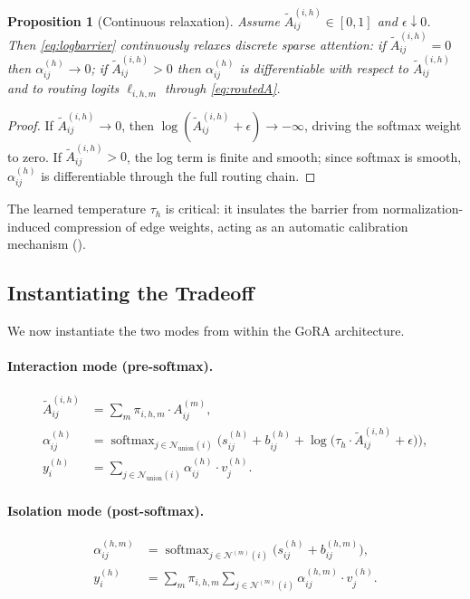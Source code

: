 \documentclass[11pt,a4paper]{article}
\newtheorem{proposition}[theorem]{Proposition}
\newcommand{\ours}{\textsc{GoRA}}  %
\newcommand{\calN}{\mathcal{N}}
\DeclareMathOperator{\softmax}{softmax}
\begin{document}
\begin{proposition}[Continuous relaxation]
  \label{prop:masking}
  Assume $\tilde{A}_{ij}^{(i,h)} \in [0, 1]$ and $\epsilon \downarrow 0$.
  Then \eqref{eq:logbarrier} continuously relaxes discrete sparse
  attention: if $\tilde{A}_{ij}^{(i,h)} = 0$ then
  $\alpha_{ij}^{(h)} \to 0$; if $\tilde{A}_{ij}^{(i,h)} > 0$ then
  $\alpha_{ij}^{(h)}$ is differentiable with respect to
  $\tilde{A}_{ij}^{(i,h)}$ and to routing logits
  $\ell_{i,h,m}$ through \eqref{eq:routedA}.
\end{proposition}

\begin{proof}
  If $\tilde{A}_{ij}^{(i,h)} \to 0$, then
  $\log(\tilde{A}_{ij}^{(i,h)} + \epsilon) \to -\infty$, driving the
  softmax weight to zero.
  If $\tilde{A}_{ij}^{(i,h)} > 0$, the log term is finite and smooth;
  since softmax is smooth, $\alpha_{ij}^{(h)}$ is differentiable
  through the full routing chain.
\end{proof}

The learned temperature $\tau_h$ is critical: it insulates the barrier
from normalization-induced compression of edge weights, acting as an
automatic calibration mechanism ().

\subsection{Instantiating the Tradeoff}
\label{sec:mixing_modes}

We now instantiate the two modes from  within the
\ours{} architecture.

\paragraph{Interaction mode (pre-softmax).}
\begin{align}
  \tilde{A}_{ij}^{(i,h)} &= \sum_{m} \pi_{i,h,m} \cdot A_{ij}^{(m)},
  \label{eq:presoftmax_A} \\
  \alpha_{ij}^{(h)} &= \softmax_{j \in \calN_{\mathrm{union}}(i)}\!\Big(
    s_{ij}^{(h)} + b_{ij}^{(h)} +
    \log\big(\tau_h \cdot \tilde{A}_{ij}^{(i,h)} + \epsilon\big)\Big),
  \label{eq:presoftmax_attn} \\
  y_i^{(h)} &= \sum_{j \in \calN_{\mathrm{union}}(i)}
    \alpha_{ij}^{(h)} \cdot v_j^{(h)}.
  \label{eq:presoftmax_agg}
\end{align}

\paragraph{Isolation mode (post-softmax).}
\begin{align}
  \alpha_{ij}^{(h,m)} &= \softmax_{j \in \calN^{(m)}(i)}\!\Big(
    s_{ij}^{(h)} + b_{ij}^{(h,m)}\Big),
  \label{eq:postsoftmax_attn} \\
  y_i^{(h)} &= \sum_{m} \pi_{i,h,m} \sum_{j \in \calN^{(m)}(i)}
    \alpha_{ij}^{(h,m)} \cdot v_j^{(h)}.
  \label{eq:postsoftmax_agg}
\end{align}
\end{document}
